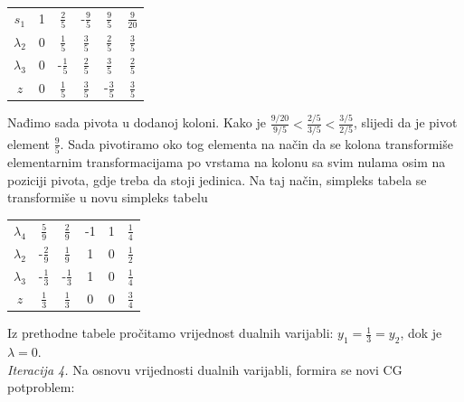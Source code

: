 \documentclass[a4paper, utf8, 11pt, colorlinks]{book}
\theoremstyle{definition}
\begin{document}
\begin{center}
	
	\begin{tabular}{c|cccc|c}
		$s_1$	    &   1      &    $\frac{2}{5}$          &   -$\frac{9}{5}$       &  $\frac{9}{5} $        &  $\frac{9}{20}$ \\
		$\lambda_2$  &   0      &    $\frac{1}{5}$         &   $\frac{3}{5}$        &   $\frac{2}{5}$        &  $\frac{3}{5}$             \\
		$\lambda_3$  &   0      &    -$\frac{1}{5}$        &   $\frac{2}{5}$        &   $\frac{3}{5}$         &  $\frac{2}{5}$            \\ \hline
		$z$          &   0      &    $\frac{1}{5}$         &  $ \frac{3}{5}$        &   -$\frac{3}{5}$         & $\frac{3}{5}$
	\end{tabular}
	
\end{center} 
Nađimo sada pivota u dodanoj koloni. Kako je $\frac{9/20}{9/5} < \frac{2/5}{3/5}< \frac{3/5}{2/5}$, slijedi da je pivot element $\frac{9}{5}$.  Sada pivotiramo oko tog elementa na način da se kolona transformiše elementarnim transformacijama po vrstama na kolonu sa svim nulama osim na poziciji pivota, gdje treba da stoji jedinica. Na taj način, simpleks tabela se transformiše u novu simpleks tabelu 
\begin{center}
	
	\begin{tabular}{c|cccc|c}
		$\lambda_4$	 &   $\frac{5}{9}$      &    $\frac{2}{9}$          &   -1       &  1      &  $\frac{1}{4}$ \\
		$\lambda_2$  &   -$\frac{2}{9}$    &   $\frac{1}{9}$        &   1        &   0         &  $\frac{1}{2}$        \\
	    $\lambda_3$  &  -$\frac{1}{3}$     &    -$\frac{1}{3}$      &   1        &   0        &  $\frac{1}{4}$      
		    \\ \hline
		$z$          &   $\frac{1}{3}$     &    $\frac{1}{3}$         &  $0$        &  0         & $\frac{3}{4}$
	\end{tabular}
	
\end{center} 
Iz prethodne tabele pročitamo vrijednost dualnih varijabli: $y_1 =  \frac{1}{3}=y_2$, dok je $\lambda=0$. \\
\emph{Iteracija 4.} Na osnovu vrijednosti dualnih varijabli, formira se novi CG potproblem:
 
\end{document}
